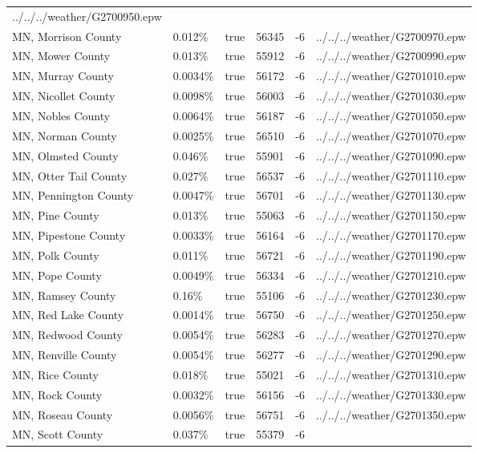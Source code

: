 \begin{longtable}[]{@{}llllll@{}}
../../../weather/G2700950.epw \\
MN, Morrison County & 0.012\% & true & 56345 & -6 &
../../../weather/G2700970.epw \\
MN, Mower County & 0.013\% & true & 55912 & -6 &
../../../weather/G2700990.epw \\
MN, Murray County & 0.0034\% & true & 56172 & -6 &
../../../weather/G2701010.epw \\
MN, Nicollet County & 0.0098\% & true & 56003 & -6 &
../../../weather/G2701030.epw \\
MN, Nobles County & 0.0064\% & true & 56187 & -6 &
../../../weather/G2701050.epw \\
MN, Norman County & 0.0025\% & true & 56510 & -6 &
../../../weather/G2701070.epw \\
MN, Olmsted County & 0.046\% & true & 55901 & -6 &
../../../weather/G2701090.epw \\
MN, Otter Tail County & 0.027\% & true & 56537 & -6 &
../../../weather/G2701110.epw \\
MN, Pennington County & 0.0047\% & true & 56701 & -6 &
../../../weather/G2701130.epw \\
MN, Pine County & 0.013\% & true & 55063 & -6 &
../../../weather/G2701150.epw \\
MN, Pipestone County & 0.0033\% & true & 56164 & -6 &
../../../weather/G2701170.epw \\
MN, Polk County & 0.011\% & true & 56721 & -6 &
../../../weather/G2701190.epw \\
MN, Pope County & 0.0049\% & true & 56334 & -6 &
../../../weather/G2701210.epw \\
MN, Ramsey County & 0.16\% & true & 55106 & -6 &
../../../weather/G2701230.epw \\
MN, Red Lake County & 0.0014\% & true & 56750 & -6 &
../../../weather/G2701250.epw \\
MN, Redwood County & 0.0054\% & true & 56283 & -6 &
../../../weather/G2701270.epw \\
MN, Renville County & 0.0054\% & true & 56277 & -6 &
../../../weather/G2701290.epw \\
MN, Rice County & 0.018\% & true & 55021 & -6 &
../../../weather/G2701310.epw \\
MN, Rock County & 0.0032\% & true & 56156 & -6 &
../../../weather/G2701330.epw \\
MN, Roseau County & 0.0056\% & true & 56751 & -6 &
../../../weather/G2701350.epw \\
MN, Scott County & 0.037\% & true & 55379 & -6 &

\end{longtable}

